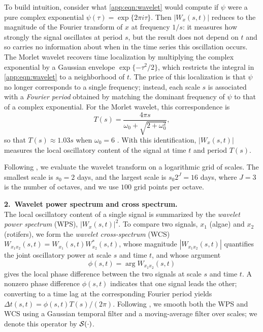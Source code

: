 To build intuition, consider what \cref{app:eqn:wavelet} would compute if $\psi$ were a pure complex exponential $\psi(\tau) = \exp\{2 \pi i \tau\}$. Then $|W_x(s, t)|$ reduces to the magnitude of the Fourier transform of $x$ at frequency $1/s$: it measures how strongly the signal oscillates at period $s$, but the result does not depend on $t$ and so carries no information about when in the time series this oscillation occurs. 
The Morlet wavelet recovers time localization by multiplying the complex exponential by a Gaussian envelope $\exp\{-\tau^2/2\}$, which restricts the integral in \cref{app:eqn:wavelet} to a neighborhood of $t$. 
The price of this localization is that $\psi$ no longer corresponds to a single frequency; instead, each scale $s$ is associated with a \emph{Fourier period} obtained by matching the dominant frequency of $\psi$ to that of a complex exponential. 
For the Morlet wavelet, this correspondence is
\begin{equation}\label{app:eqn:fourier-period}
    T(s) = \frac{4 \pi s}{\omega_0 + \sqrt{2 + \omega_0^2}},
\end{equation}
so that $T(s) \approx 1.03 s$ when $\omega_0 = 6$ \citep{torrence1998practical}. With this identification, $|W_x(s, t)|$ measures the local oscillatory content of the signal at time $t$ and period $T(s)$.

Following \citet{blasius2020long}, we evaluate the wavelet transform on a logarithmic grid of scales. The smallest scale is $s_0 = 2$ days, and the largest scale is $s_0 2^J = 16$ days, where $J = 3$ is the number of octaves, and we use $100$ grid points per octave.

\textbf{2.~Wavelet power spectrum and cross spectrum.}\\
The local oscillatory content of a single signal is summarized by the \emph{wavelet power spectrum} (WPS), $|W_x(s, t)|^2$. 
To compare two signals, $x_1$ (algae) and $x_2$ (rotifers), we form the \emph{wavelet cross-spectrum} (WCS) $W_{x_1 x_2}(s, t) = W_{x_1}(s, t) W_{x_2}^*(s, t)$, whose magnitude $|W_{x_1 x_2}(s, t)|$ quantifies the joint oscillatory power at scale $s$ and time $t$, and whose argument
\begin{equation}\label{app:eqn:phase}
    \phi(s, t) = \arg W_{x_1 x_2}(s, t)
\end{equation}
gives the local phase difference between the two signals at scale $s$ and time $t$. 
A nonzero phase difference $\phi(s, t)$ indicates that one signal leads the other; converting to a time lag at the corresponding Fourier period yields $\Delta t (s, t) = \phi(s, t) T(s) / (2 \pi)$.
Following \citet{blasius2020long}, we smooth both the WPS and WCS using a Gaussian temporal filter and a moving-average filter over scales; we denote this operator by $\mathcal{S}(\cdot)$.
 
